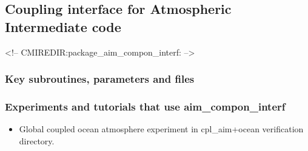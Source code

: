 \subsection{Coupling interface for Atmospheric Intermediate code}
\label{sec:pkg:aim_compon_interf}
\begin{rawhtml}
<!-- CMIREDIR:package_aim_compon_interf: -->
\end{rawhtml}

\subsubsection{Key subroutines, parameters and files}
\label{sec:pkg:aim_compon_interf:implementation_synopsis}

\subsubsection{Experiments and tutorials that use aim\_compon\_interf}
\label{sec:pkg:aim_compon_interf:experiments}

\begin{itemize}
\item{Global coupled ocean atmosphere experiment in cpl\_aim+ocean verification directory. }
\end{itemize}

